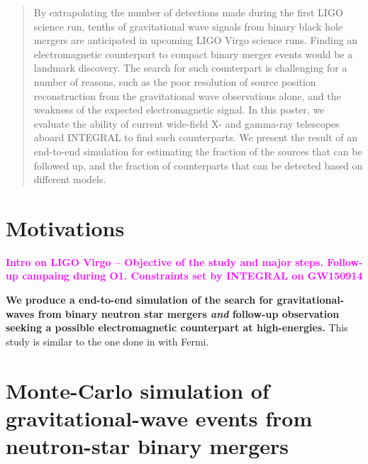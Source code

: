 \documentclass[a0,portrait]{a0poster}
\renewcommand{\emph}[1]{\textbf{\color{blue}#1}}
\newcommand{\ECM}[1] {\textbf{\textcolor{magenta}{#1}}}
\begin{document}
\begin{multicols}{2} %


 \begin{abstract}
   By extrapolating the number of detections made during the first LIGO science
   run, tenths of gravitational wave signals from binary black hole mergers are
   anticipated in upcoming LIGO Virgo science runs. Finding an electromagnetic
   counterpart to compact binary merger events would be a landmark
   discovery. The search for such counterpart is challenging for a number of
   reasons, such as the poor resolution of source position reconstruction from
   the gravitational wave observations alone, and the weakness of the expected
   electromagnetic signal. In this poster, we evaluate the ability of current
   wide-field X- and gamma-ray telescopes aboard INTEGRAL to find such
   counterparts. We present the result of an end-to-end simulation for
   estimating the fraction of the sources that can be followed up, and the
   fraction of counterparts that can be detected based on different models.
 \end{abstract}


\section*{Motivations}

\ECM{Intro on LIGO Virgo -- Objective of the study and major steps. Follow-up 
campaing during O1. Constraints set by INTEGRAL on GW150914 \cite{2041-8205-820-2-L36}}

\emph{We produce a end-to-end simulation of the search for gravitational-waves
from binary neutron star mergers \textit{and} follow-up observation seeking a
 possible electromagnetic counterpart at high-energies.} This study is similar
to the one done in \cite{2016arXiv160606124P} with Fermi.

\section*{Monte-Carlo simulation of gravitational-wave events from neutron-star binary mergers}


\end{multicols}
\end{document}
